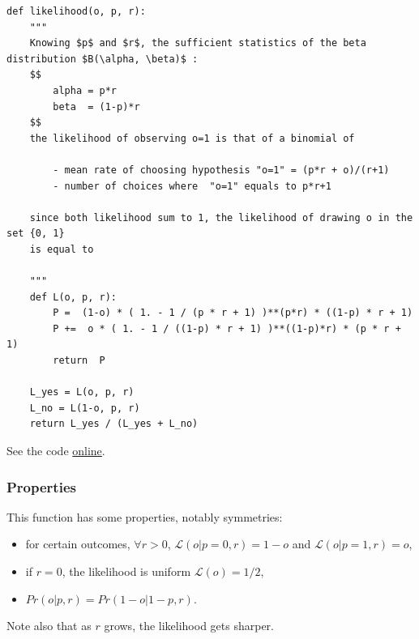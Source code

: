 \documentclass[10pt,letterpaper]{article}
\newcommand{\Ll}{\mathcal{L}}
\newcommand{\seeApp}[1]{Appendix~\ref{app:#1}}
\begin{document}
\begin{lstlisting}
def likelihood(o, p, r):
    """
    Knowing $p$ and $r$, the sufficient statistics of the beta distribution $B(\alpha, \beta)$ :
    $$
        alpha = p*r
        beta  = (1-p)*r
    $$
    the likelihood of observing o=1 is that of a binomial of

        - mean rate of choosing hypothesis "o=1" = (p*r + o)/(r+1)
        - number of choices where  "o=1" equals to p*r+1

    since both likelihood sum to 1, the likelihood of drawing o in the set {0, 1}
    is equal to

    """
    def L(o, p, r):
        P =  (1-o) * ( 1. - 1 / (p * r + 1) )**(p*r) * ((1-p) * r + 1)
        P +=  o * ( 1. - 1 / ((1-p) * r + 1) )**((1-p)*r) * (p * r + 1)
        return  P

    L_yes = L(o, p, r)
    L_no = L(1-o, p, r)
    return L_yes / (L_yes + L_no)

\end{lstlisting}

See the code \href{https://github.com/laurentperrinet/bayesianchangepoint/blob/master/bayesianchangepoint/bcp.py#L65}{online}.
\subsubsection{Properties}
This function has some properties, notably symmetries:
	\begin{itemize}
		\item for certain outcomes, $\forall r >0$, $\Ll(o|p=0, r)=1-o$ and $\Ll(o|p=1, r)=o$,
		\item if $r=0$, the likelihood is uniform $\Ll(o)=1/2$,
		\item $Pr(o | p, r)=Pr(1-o | 1-p, r)$.
	\end{itemize}

\noindent Note also that as $r$ grows, the likelihood gets sharper.


\end{document}
